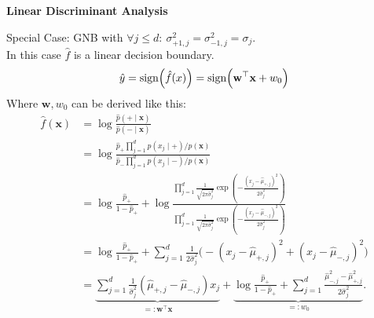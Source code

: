 \method \textbf{Linear Discriminant Analysis}

Special Case: GNB with $\forall j \leq d:\ \sigma_{+1,j}^2 = \sigma_{-1,j}^2 = \sigma_j$.\\
In this case $\hat{f}$ is a linear decision boundary.
$$
    \hat{y} = \text{sign}\Bigl( \hat{f}(x) \Bigr) = \text{sign}\Bigl( \mathbf{w}^\top \mathbf{x} + w_0 \Bigr)
$$
Where $\mathbf{w}, w_0$ can be derived like this:
{\footnotesize
\begin{align*}
\widehat{f}(\boldsymbol{x}) &= \log \frac{\widehat{p}(+\mid \boldsymbol{x})}{\widehat{p}(-\mid \boldsymbol{x})} \\
                            &= \log \frac{\widehat{p}_+ \prod_{j=1}^d p(x_j \mid +) / p(\boldsymbol{x})}{\widehat{p}_- \prod_{j=1}^d p(x_j \mid -) / p(\boldsymbol{x})} \\
                            &= \log \frac{\widehat{p}_+}{1 - \widehat{p}_+} + \log \frac{\prod_{j=1}^d \frac{1}{\sqrt{2\pi\widehat{\sigma}_j^2}} \exp \left( -\frac{(x_j - \widehat{\mu}_{+,j})^2}{2\widehat{\sigma}_j^2} \right)}{\prod_{j=1}^d \frac{1}{\sqrt{2\pi\widehat{\sigma}_j^2}} \exp \left( -\frac{(x_j - \widehat{\mu}_{-,j})^2}{2\widehat{\sigma}_j^2} \right)} \\
                            &= \log \frac{\widehat{p}_+}{1 - \widehat{p}_+} + \sum_{j=1}^d \frac{1}{2\widehat{\sigma}_j^2} \biggl( -(x_j - \widehat{\mu}_{+,j})^2 + (x_j - \widehat{\mu}_{-,j})^2 \biggr) \\
                            &= \underbrace{\sum_{j=1}^d \frac{1}{\widehat{\sigma}_j^2} \left( \widehat{\mu}_{+,j} - \widehat{\mu}_{-,j} \right) x_j}_{=: \boldsymbol{w}^\top \boldsymbol{x}} + \underbrace{\log \frac{\widehat{p}_+}{1 - \widehat{p}_+} + \sum_{j=1}^d \frac{\widehat{\mu}_{-,j}^2 - \widehat{\mu}_{+,j}^2}{2\widehat{\sigma}_j^2}}_{=: w_0}.
\end{align*}
}

